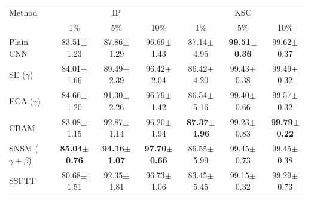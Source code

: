 \begin{tabular}{lcccccc}
\toprule
Method & \multicolumn{3}{c}{IP} & \multicolumn{3}{c}{KSC} \\
 & 1\% & 5\% & 10\% & 1\% & 5\% & 10\% \\
\midrule
Plain CNN & 83.51$\pm$1.23 & 87.86$\pm$1.29 & 96.69$\pm$1.43 & 87.14$\pm$4.95 & \textbf{99.51$\pm$0.36} & 99.62$\pm$0.37 \\
SE ($\gamma$) & 84.01$\pm$1.66 & 89.49$\pm$2.39 & 96.42$\pm$2.04 & 86.42$\pm$4.20 & 99.43$\pm$0.38 & 99.49$\pm$0.32 \\
ECA ($\gamma$) & 84.66$\pm$1.20 & 91.30$\pm$2.26 & 96.79$\pm$1.42 & 86.54$\pm$5.16 & 99.40$\pm$0.66 & 99.57$\pm$0.32 \\
CBAM & 83.08$\pm$1.15 & 92.87$\pm$1.14 & 96.20$\pm$1.94 & \textbf{87.37$\pm$4.96} & 99.23$\pm$0.83 & \textbf{99.79$\pm$0.22} \\
SNSM ($\gamma{+}\beta$) & \textbf{85.04$\pm$0.76} & \textbf{94.16$\pm$1.07} & \textbf{97.70$\pm$0.66} & 86.55$\pm$5.99 & 99.45$\pm$0.73 & 99.45$\pm$0.38 \\
SSFTT & 80.68$\pm$1.51 & 92.35$\pm$1.81 & 96.73$\pm$1.06 & 83.45$\pm$5.45 & 99.15$\pm$0.32 & 99.29$\pm$0.73 \\
\bottomrule
\end{tabular}
